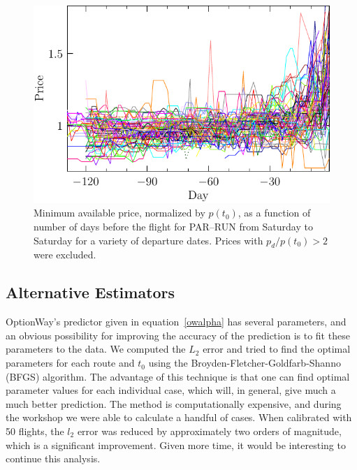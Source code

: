 \documentclass{article}
\begin{document}
\begin{figure}
  \begin{center}
    \includegraphics{pdf/PARRUN_SAT_7_norm}
    \caption{Minimum available price, normalized by $p(t_0)$, as a
      function of number of days before the flight for PAR--RUN from
      Saturday to Saturday for a variety of departure dates.  Prices
      with $p_d/p(t_0) > 2$ were excluded.}
    \label{PARRUN_SAT_7_norm}
  \end{center}
\end{figure}


\subsection{Alternative Estimators}

OptionWay's predictor given in equation~\eqref{owalpha} has several
parameters, and an obvious possibility for improving the accuracy of
the prediction is to fit these parameters to the data.  We computed
the $L_2$ error and tried to find the optimal parameters for each
route and $t_0$ using the Broyden-Fletcher-Goldfarb-Shanno (BFGS)
algorithm.  The advantage of this technique is that one can find
optimal parameter values for each individual case, which will, in
general, give much a much better prediction.  The method is
computationally expensive, and during the workshop we were able to
calculate a handful of cases.  When calibrated with 50 flights, the
$l_2$ error was reduced by approximately two orders of magnitude,
which is a significant improvement.  Given more time, it would be
interesting to continue this analysis.
\end{document}
